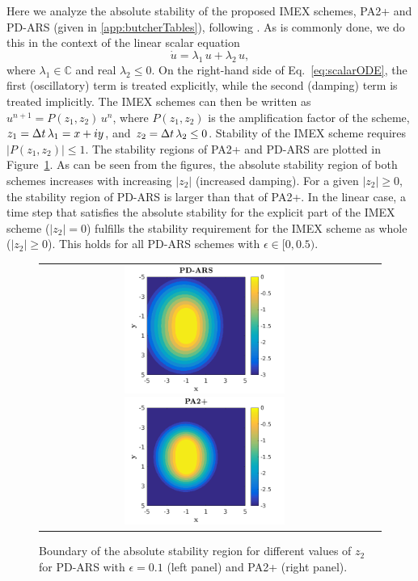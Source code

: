 Here we analyze the absolute stability of the proposed IMEX schemes, PA2+ and PD-ARS (given in \ref{app:butcherTables}), following \cite{hu_etal_2018}.  
As is commonly done, we do this in the context of the linear scalar equation
\begin{equation}
  \dot{u}=\lambda_{1}\,u+\lambda_{2}\,u,
  \label{eq:scalarODE}
\end{equation}
where $\lambda_{1}\in\mathbb{C}$ and real $\lambda_{2}\le0$.  
On the right-hand side of Eq.~\eqref{eq:scalarODE}, the first (oscillatory) term is treated explicitly, while the second (damping) term is treated implicitly.  
The IMEX schemes can then be written as $u^{n+1} =P(z_{1},z_{2})\,u^{n}$, where $P(z_{1},z_{2})$ is the amplification factor of the scheme, $z_{1}=\Delta t\,\lambda_{1} = x +iy$, and $z_{2} = \Delta t\,\lambda_{2} \le 0$.  
Stability of the IMEX scheme requires $|P(z_1,z_2)|\leq 1$.  
The stability regions of PA2+ and PD-ARS are plotted in Figure~\ref{fig:AbsoluteStability}.  
As can be seen from the figures, the absolute stability region of both schemes increases with increasing $|z_{2}|$ (increased damping).  
For a given $|z_{2}|\ge0$, the stability region of PD-ARS is larger than that of PA2+.  
In the linear case, a time step that satisfies the absolute stability for the explicit part of the IMEX scheme ($|z_2| = 0$) fulfills the stability requirement for the IMEX scheme as whole ($|z_2| \geq 0$).  
This holds for all PD-ARS schemes with $\epsilon\in [0,0.5)$.
\begin{figure}[h]
  \centering
  \begin{tabular}{cc}
    \includegraphics[width=0.5\textwidth]{figures/AbsoluteStabilityPARSD}
    \includegraphics[width=0.5\textwidth]{figures/AbsoluteStabilityPA2+}
  \end{tabular}
   \caption{Boundary of the absolute stability region for different values of $z_2$ for PD-ARS with $\epsilon = 0.1$ (left panel) and PA2+ (right panel).}
  \label{fig:AbsoluteStability}
\end{figure}
